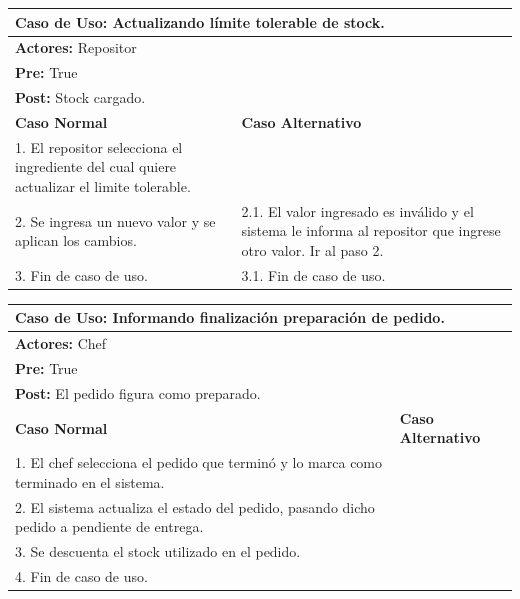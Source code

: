 \documentclass[a4paper,11pt] {article}
\begin{document}
\begin{center}
	\begin{tabular}{ | p{6.5cm} | p{6.5cm} | }
		\hline
			\multicolumn{2}{|l|}{\textbf{Caso de Uso:} Actualizando l\'imite tolerable de stock.} \\
		\hline
			\multicolumn{2}{|l|}{\textbf{Actores:} Repositor} \\
		\hline
			\multicolumn{2}{|l|}{\textbf{Pre:} True} \\
		\hline
			\multicolumn{2}{|l|}{\textbf{Post:} Stock cargado.} \\
		\hline
		\textbf{Caso Normal} & \textbf{Caso Alternativo}	\\
		\hline
		1. El repositor selecciona el ingrediente del cual quiere actualizar el limite tolerable. &	\\
		\hline
		2. Se ingresa un nuevo valor y se aplican los cambios. & 2.1. El valor ingresado es inv\'alido y el sistema le informa al repositor que ingrese otro valor. Ir al paso 2.	\\
		\hline
		3. Fin de caso de uso. & 3.1. Fin de caso de uso.	\\
		\hline
	\end{tabular}
\end{center}

\begin{center}
	\begin{tabular}{ | p{6.5cm} | p{6.5cm} | }
		\hline
			\multicolumn{2}{|l|}{\textbf{Caso de Uso:} Informando finalizaci\'on preparaci\'on de pedido.} \\
		\hline
			\multicolumn{2}{|l|}{\textbf{Actores:} Chef} \\
		\hline
			\multicolumn{2}{|l|}{\textbf{Pre:} True} \\
		\hline
			\multicolumn{2}{|l|}{\textbf{Post:} El pedido figura como preparado.} \\
		\hline
		\textbf{Caso Normal} & \textbf{Caso Alternativo}	\\
		\hline
		1. El chef selecciona el pedido que termin\'o y lo marca como terminado en el sistema. &	\\
		\hline
		2. El sistema actualiza el estado del pedido, pasando dicho pedido a pendiente de entrega. &	\\
		\hline
		3. Se descuenta el stock utilizado en el pedido. &	\\
		\hline
		4. Fin de caso de uso. &	\\
		\hline
	\end{tabular}
\end{center}
\end{document}

